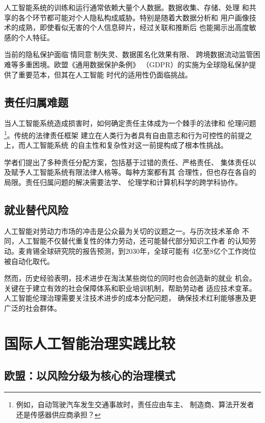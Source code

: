\documentclass{xmu_course}
\begin{document}
人工智能系统的训练和运行通常依赖大量个人数据。数据收集、存储、处理
和共享的各个环节都可能对个人隐私构成威胁。特别是随着大数据分析和
用户画像技术的成熟，即使看似无害的个人信息碎片，经过关联和推断后
也能揭示出高度敏感的个人特征\cite{taylor2017}。

当前的隐私保护面临\"知情同意\"机制失灵、数据匿名化效果有限、
跨境数据流动监管困难等多重困境。欧盟《通用数据保护条例》
（GDPR）的实施为全球隐私保护提供了重要范本，但其在人工智能
时代的适用性仍面临挑战。

\subsection{责任归属难题}

当人工智能系统造成损害时，如何确定责任主体成为一个棘手的法律和
伦理问题\footnote{例如，自动驾驶汽车发生交通事故时，责任应由车主、
制造商、算法开发者还是传感器供应商承担？}。传统的法律责任框架
建立在人类行为者具有自由意志和行为可控性的前提之上，而人工智能系统
的自主性和复杂性对这一前提构成了根本性挑战。

学者们提出了多种责任分配方案，包括基于过错的责任、严格责任、
集体责任以及赋予人工智能系统有限法律人格等。每种方案都有其
合理性，但也存在各自的局限。责任归属问题的解决需要法学、
伦理学和计算机科学的跨学科协作。

\subsection{就业替代风险}

人工智能对劳动力市场的冲击是公众最为关切的议题之一。与历次技术革命
不同，人工智能不仅替代重复性的体力劳动，还可能替代部分知识工作者
的认知劳动。麦肯锡全球研究院的报告预测，到2030年，全球可能有
4亿至8亿个工作岗位被自动化取代\cite{mckinsey2017}。

然而，历史经验表明，技术进步在淘汰某些岗位的同时也会创造新的就业
机会。关键在于建立有效的社会保障体系和职业培训机制，帮助劳动者
适应技术变革。人工智能伦理治理需要关注技术进步的成本分配问题，
确保技术红利能够惠及更广泛的社会群体。

\section{国际人工智能治理实践比较}

\subsection{欧盟：以风险分级为核心的治理模式}
\end{document}

